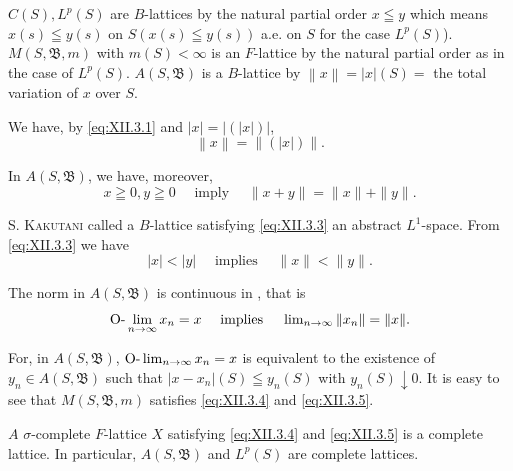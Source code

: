 \begin{examplen} $C(S), L^p(S)$ are $B$-lattices by the natural partial order $x \leqq y$ which means $x(s) \leqq y(s)$ on $S(x(s) \leqq y(s))$ a.e. on $S$ for the case $L^p(S)$). $M(S, \mathfrak{B}, m)$ with $m(S) < \infty$ is an $F$-lattice by the natural partial order as in the case of $L^p(S)$. $A(S, \mathfrak{B})$ is a $B$-lattice by
$\left\| x \right\| = | x | (S) =$ the total variation of $x$ over $S.$


We have, by \eqref{eq:XII.3.1} and $|x| = |(|x|)|$, 
\begin{equation}\label{eq:XII.3.2}
\left\| x \right\| = \left\| (| x |) \right\|.
\end{equation}

In $A(S, \mathfrak{B})$, we have, moreover, 
\begin{equation}\label{eq:XII.3.3}
x \geqq 0, y \geqq 0 \quad \text{ imply } \quad \| x + y \| = \| x \| + \| y \|.
\end{equation}

S. \textsc{Kakutani} called a $B$-lattice satisfying \eqref{eq:XII.3.3} an abstract $L^1$-space. From \eqref{eq:XII.3.3} we have 
\begin{equation}\label{eq:XII.3.4}
| x | < | y | \quad \text{ implies } \quad \| x \| < \| y \|.
\end{equation}

The norm in $A(S, \mathfrak{B})$ is continuous in \Olim, that is 
\begin{equation}\label{eq:XII.3.5}
\text{O-}\lim _{n \to \infty} x _{n} = x \quad \text{ implies } \quad \lim\nolimits _{n \to \infty} \| x _{n} \| = \| x \|.
\end{equation}

For, in $A(S, \mathfrak{B})$, $\text{O-}\lim_{n \to \infty} x_n = x$ is equivalent to the existence of $y_n \in A(S, \mathfrak{B})$ such that $|x - x_n| (S) \leqq y_n(S)$ with $y_n(S) \downarrow 0$. It is easy to see that $M(S, \mathfrak{B}, m)$ satisfies \eqref{eq:XII.3.4} and \eqref{eq:XII.3.5}. 

\end{examplen}
\begin{proposition}\label{prop:XII.3.Proposition.1} $A$ $\sigma$-complete $F$-lattice $X$ satisfying \eqref{eq:XII.3.4} and \eqref{eq:XII.3.5} is a complete lattice. In particular, $A(S, \mathfrak{B})$ and $L^p(S)$ are complete lattices. 
\end{proposition}

